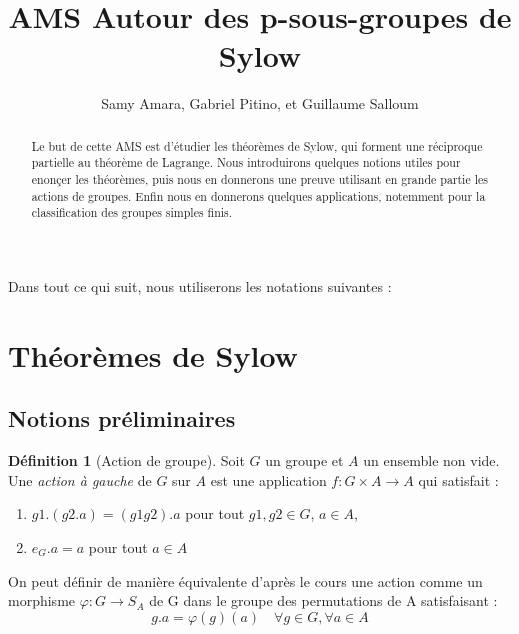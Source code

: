 \documentclass{article}
\title{AMS Autour des p-sous-groupes de Sylow}
\author{Samy Amara, Gabriel Pitino, et Guillaume Salloum}
\date{}
\theoremstyle{definition}
\newtheorem{definition}[subsubsection]{Définition}
\theoremstyle{plain}
\theoremstyle{plain}
\theoremstyle{plain}
\theoremstyle{plain}
\theoremstyle{definition}
\theoremstyle{plain}
\theoremstyle{plain}
\begin{document}
\maketitle

\begin{abstract}
	Le but de cette AMS est d'étudier les théorèmes de Sylow, qui forment une réciproque partielle au théorème de Lagrange.
	Nous introduirons quelques notions utiles pour enonçer les théorèmes, puis nous en donnerons une preuve utilisant en grande partie les actions de groupes.
	Enfin nous en donnerons quelques applications, notemment pour la classification des groupes simples finis.%
\end{abstract}



\tableofcontents
\clearpage

Dans tout ce qui suit, nous utiliserons les notations suivantes :
\glsaddall
\renewcommand*{\arraystretch}{1.2} %
\printnoidxglossary[title=Notations,type=symbols,style=long,sort=standard,nonumberlist]

\clearpage


\section{Théorèmes de Sylow}
\subsection{Notions préliminaires}


\begin{definition}[Action de groupe]
	Soit \( G \) un groupe et \( A \) un ensemble non vide. Une \textit{action à gauche} de \( G \) sur \( A \) est une application \( f : G \times A \rightarrow A\) qui satisfait :
	\begin{enumerate}[label = (\roman*)]
		\item \(g1.(g2.a) = (g1g2).a \) pour tout \(g1,g2 \in G\), \(a \in A\),
		\item \(e_G.a = a\) pour tout \(a \in A\)
	\end{enumerate}

	On peut définir de manière équivalente d'après le cours une action comme un morphisme \( \varphi : G \rightarrow S_{A} \) de G dans le groupe des permutations de A satisfaisant :
	\begin{equation}
		g.a = \varphi(g)(a) \quad \forall g \in G, \forall a \in A
	\end{equation}
\end{definition}
\end{document}
